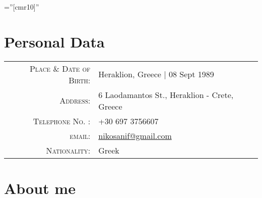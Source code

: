 \documentclass[11pt]{article}
\begin{document}

\font\fb=''[cmr10]'' 

\par{\par}
\par{\par}
\bigskip

\section{Personal Data}

\begin{tabular}{rl}
    \textsc{Place \& Date of Birth:}    & Heraklion, Greece | 08 Sept 1989 \\
    \textsc{Address:}                   & 6 Laodamantos St., Heraklion - Crete, Greece \\
    \textsc{Telephone No. :}            & +30 697 3756607 \\
    \textsc{email:}                     & \href{mailto:nikosanif@gmail.com}{nikosanif@gmail.com} \\
    \textsc{Nationality:}               & Greek \\
\end{tabular}

\section{About me}
\end{document}

